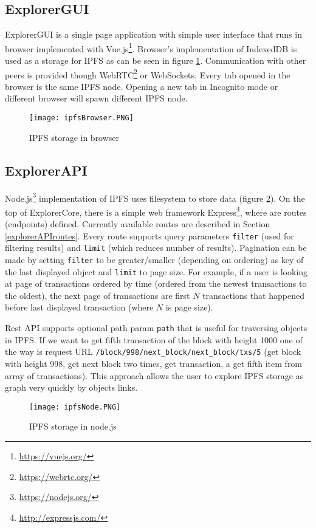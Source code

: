 \subsection{ExplorerGUI}
ExplorerGUI is a single page application with simple user interface that runs in browser implemented with Vue.js\footnote{\url{https://vuejs.org/}}. Browser's implementation of IndexedDB is used as a storage for IPFS as can be seen in figure \ref{browserIPFS}. Communication with other peers is provided though WebRTC\footnote{\url{https://webrtc.org/}} or WebSockets. Every tab opened in the browser is the same IPFS node. Opening a new tab in Incognito mode or different browser will spawn different IPFS node.

\begin{figure}[h]
    \centering
    \texttt{[image: ipfsBrowser.PNG]}
    \caption{IPFS storage in browser}
    \label{browserIPFS}
\end{figure}


\subsection{ExplorerAPI}
Node.js\footnote{\url{https://nodejs.org/}} implementation of IPFS uses filesystem to store data (figure \ref{nodeIPFS}). On the top of ExplorerCore, there is a simple web framework Express\footnote{\url{http://expressjs.com/}}, where are routes (endpoints) defined. Currently available routes are described in Section \ref{explorerAPIroutes}. Every route supports query parameters \texttt{filter} (used for filtering results) and \texttt{limit} (which reduces number of results). Pagination can be made by setting \texttt{filter} to be greater/smaller (depending on ordering) as key of the last displayed object and \texttt{limit} to page size. For example, if a user is looking at page of transactions ordered by time (ordered from the newest transactions to the oldest), the next page of transactions are first \(N\) transactions that happened before last displayed transaction (where \(N\) is page size).

Rest API supports optional path param \texttt{path} that is useful for traversing objects in IPFS. If we want to get fifth transaction of the block with height 1000 one of the way is request URL \texttt{/block/998/next\_block/next\_block/txs/5} (get block with height 998, get next block two times, get transaction, a get fifth item from array of transactions). This approach allows the user to explore IPFS storage as graph very quickly by objects links.

\begin{figure}[h]
    \centering
    \texttt{[image: ipfsNode.PNG]}
    \caption{IPFS storage in node.js}
    \label{nodeIPFS}
\end{figure}
